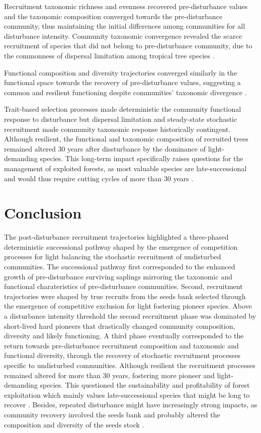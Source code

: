 \documentclass[fleqn,10pt]{ArtEcoFoG} %
\begin{document}
Recruitment taxonomic richness and evenness recovered pre-disturbance
values and the taxonomic composition converged towards the
pre-disturbance community, thus maintaining the initial differences
among communities for all disturbance intensity. Community taxonomic
convergence revealed the scarce recruitment of species that did not
belong to pre-disturbance community, due to the commonness of dispersal
limitation among tropical tree species \citep{Svenning2005}.

Functional composition and diversity trajectories converged similarly in
the functional space towards the recovery of pre-disturbance values,
suggesting a common and resilient functioning despite communities'
taxonomic divergence \citep{Fukami2005}.

Trait-based selection processes made deterministic the community
functional response to disturbance but dispersal limitation and
steady-state stochastic recruitment made community taxonomic response
historically contingent. Although resilient, the functional and
taxonomic composition of recruited trees remained altered 30 years after
dissturbance by the dominance of light-demanding species. This long-term
impact specifically raises questions for the management of exploited
forests, as most valuable species are late-successional and would thus
require cutting cycles of more than 30 years \citep{Putz2012}.

\section{Conclusion}\label{conclusion}

The post-disturbance recruitment trajectories highlighted a three-phased
deterministic successional pathway shaped by the emergence of
competition processes for light balancing the stochastic recruitment of
undisturbed communities. The successional pathway first corresponded to
the enhanced growth of pre-disturbance surviving saplings mirroring the
taxonomic and functional charateristics of pre-disturbance communities.
Second, recruitment trajectories were shaped by true recruits from the
seeds bank selected through the emergence of competitive exclusion for
light fostering pioneer species. Above a disturbance intensity threshold
the second recruitment phase was dominated by short-lived hard pioneers
that drastically changed community composition, diversity and likely
functioning. A third phase eventually corresponded to the return towards
pre-disturbance recruitment composition and taxonomic and functional
diversity, through the recovery of stochastic recruitment processes
specific to undisturbed communities. Although resilient the recruitment
processes remained altered for more than 30 years, fostering more
pioneer and light-demanding species. This questioned the sustainability
and profitability of forest exploitation which mainly values
late-successional species that might be long to recover
\citep{Putz2012}. Besides, repeated disturbance might have increasingly
strong impacts, as community recovery involved the seeds bank and
probably altered the composition and diversity of the seeds stock
\citep{Norden2009}.
\end{document}
